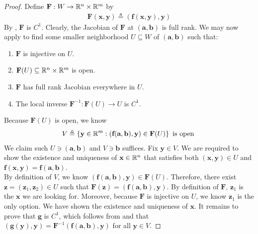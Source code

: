 \documentclass{report}
\begin{document}
\begin{proof}
Define $\textbf{F}: W \rightarrow \mathbb{R}^n \times \mathbb{R}^m$ by 
\begin{align*}
\textbf{F}(\textbf{x},\textbf{y})\triangleq \left(\textbf{f}(\textbf{x},\textbf{y}),\textbf{y} \right)
\end{align*}
By , $\textbf{F}$ is $C^1$. Clearly, the Jacobian of $\textbf{F}$ at $\left(\textbf{a},\textbf{b}\right)$ is full rank.  We may now apply  to find some smaller neighborhood $U \subseteq W$ of $\left(\textbf{a},\textbf{b} \right)$ such that: 
\begin{enumerate}[label=(\Roman*)]
  \item $\textbf{F}$ is injective on $U$.  
  \item $\textbf{F}(U)\subseteq \mathbb{R}^n \times \mathbb{R}^m$ is open.
  \item $\textbf{F}$ has full rank Jacobian everywhere in $U$.  
  \item The local inverse $\textbf{F}^{-1}: \textbf{F}(U)\rightarrow U$ is $C^1$.   
\end{enumerate}
Because $\textbf{F}(U)$ is open, we know 
\begin{align*}
V \triangleq \left\{ \textbf{y} \in\mathbb{R}^m: (\textbf{f}(\textbf{a},\textbf{b}),\textbf{y}) \in \textbf{F}(U) \right\}\text{ is open }
\end{align*}
We claim such $U\ni (\textbf{a},\textbf{b})$ and  $V\ni \textbf{b}$ suffices. Fix $\textbf{y}\in V$. We are required to show the existence and uniqueness of $\textbf{x}\in\mathbb{R}^n$ that satisfies both $(\textbf{x},\textbf{y})\in U$ and $\textbf{f}(\textbf{x},\textbf{y})=\textbf{f}(\textbf{a},\textbf{b})$. \\

By definition of $V$, we know  $\left(\textbf{f}(\textbf{a},\textbf{b}), \textbf{y} \right)\in \textbf{F}(U)$. Therefore, there exist $\textbf{z}=(\textbf{z}_1,\textbf{z}_2)\in U$ such that $\textbf{F}(\textbf{z})=\left(\textbf{f}(\textbf{a},\textbf{b}),\textbf{y} \right)$. By definition of $\textbf{F}$, $\textbf{z}_1$ is the $\textbf{x}$ we are looking for. Moreover, because $\textbf{F}$ is injective on $U$, we know $\textbf{z}_1$ is the only option. We have shown the existence and uniqueness of $\textbf{x}$. It remains to prove that $\textbf{g}$ is $C^1$, which follows from  and that $\left(\textbf{g}(\textbf{y}),\textbf{y} \right)=\textbf{F}^{-1}\left(\textbf{f}(\textbf{a},\textbf{b}),\textbf{y}\right)$ for all $\textbf{y}\in V$. 
\end{proof}
\end{document}
